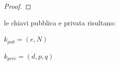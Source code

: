 \documentclass[twoside,symmetric,justified,openany,nobib]{tufte-book}
\newlength{\overwritelength}
\newlength{\minimumoverwritelength}
\newcommand{\overwritecinese}[3][red]{
  \settowidth{\overwritelength}{$#2$}
  \ifdim\overwritelength<\minimumoverwritelength
    \setlength{\overwritelength}{\minimumoverwritelength}\fi
  \stackrel{
    \begin{minipage}{\overwritelength}
      \color{#1}\centering\small #3
    \end{minipage}
    \begin{minipage}[t]{\linewidth}
      {\colorbox{black!10}{\color{black}$\displaystyle#2$}}
    \end{minipage}
  }
}
\begin{document}
{\begin{proof}

        
  \end{proof}
}le chiavi pubblica e privata risultano:

\medskip
\begin{minipage}[b]{0.45\linewidth}
  \center
  $k_{pub}=(e,N)$
\end{minipage}
\begin{minipage}[b]{0.45\linewidth}
  \center
  $k_{priv}=(d,p,q)$
\end{minipage}
\end{document}

